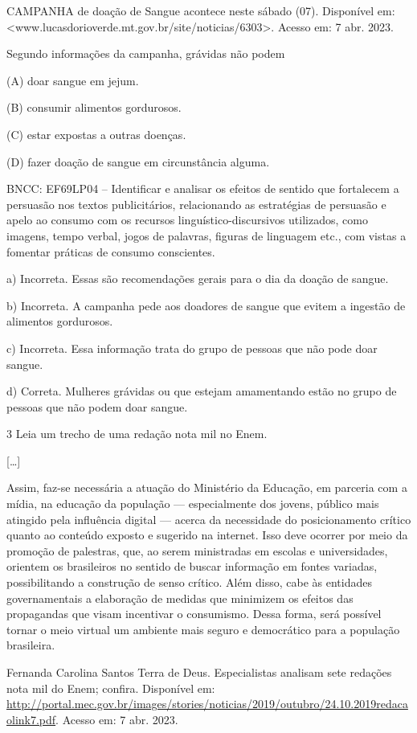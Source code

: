 \begin{itemize}
\begin{itemize}
CAMPANHA de doação de Sangue acontece neste sábado (07). Disponível em:
\textless{}www.lucasdorioverde.mt.gov.br/site/noticias/6303\textgreater{}.
Acesso em: 7 abr. 2023.

Segundo informações da campanha, grávidas não podem

(A) doar sangue em jejum.

(B) consumir alimentos gordurosos.

(C) estar expostas a outras doenças.

(D) fazer doação de sangue em circunstância alguma.

BNCC: EF69LP04 -- Identificar e analisar os efeitos de sentido que
fortalecem a persuasão nos textos publicitários, relacionando as
estratégias de persuasão e apelo ao consumo com os recursos
linguístico-discursivos utilizados, como imagens, tempo verbal, jogos de
palavras, figuras de linguagem etc., com vistas a fomentar práticas de
consumo conscientes.

a) Incorreta. Essas são recomendações gerais para o dia da doação de
sangue.

b) Incorreta. A campanha pede aos doadores de sangue que evitem a
ingestão de alimentos gordurosos.

c) Incorreta. Essa informação trata do grupo de pessoas que não pode
doar sangue.

d) Correta. Mulheres grávidas ou que estejam amamentando estão no grupo
de pessoas que não podem doar sangue.

\num{3} Leia um trecho de uma redação nota mil no Enem.

{[}\ldots{}{]}

Assim, faz-se necessária a atuação do Ministério da Educação, em
parceria com a mídia, na educação da população --- especialmente dos
jovens, público mais atingido pela influência digital --- acerca da
necessidade do posicionamento crítico quanto ao conteúdo exposto e
sugerido na internet. Isso deve ocorrer por meio da promoção de
palestras, que, ao serem ministradas em escolas e universidades,
orientem os brasileiros no sentido de buscar informação em fontes
variadas, possibilitando a construção de senso crítico. Além disso, cabe
às entidades governamentais a elaboração de medidas que minimizem os
efeitos das propagandas que visam incentivar o consumismo. Dessa forma,
será possível tornar o meio virtual um ambiente mais seguro e
democrático para a população brasileira.

Fernanda Carolina Santos Terra de Deus. Especialistas analisam sete
redações nota mil do Enem; confira. Disponível em:
\url{http://portal.mec.gov.br/images/stories/noticias/2019/outubro/24.10.2019redacaolink7.pdf}.
Acesso em: 7 abr. 2023.


\end{itemize}
\end{itemize}
